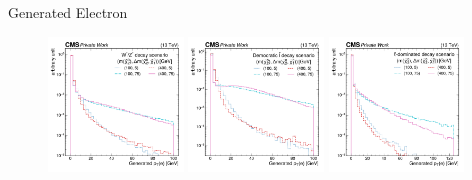 \begin{frame}[fragile]{Generated Electron \pt}
  \begin{figure}[htpb]
    \centering
    \includegraphics[width=0.32\textwidth]{fig/sig/Sig_wz_GenElectronPt.pdf}
    \includegraphics[width=0.32\textwidth]{fig/sig/Sig_democratic_GenElectronPt.pdf}
    \includegraphics[width=0.32\textwidth]{fig/sig/Sig_stau_GenElectronPt.pdf}
  \end{figure}	
\end{frame}


